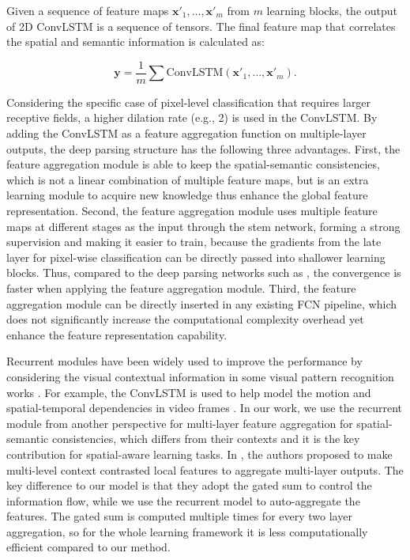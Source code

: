 \documentclass[10pt,twocolumn,twoside]{IEEEtran}
\begin{document}
Given a sequence of feature maps $\mathbf{x}'_1, \ldots, \mathbf{x}'_m$ from $m$ learning blocks, the output of 2D ConvLSTM is a sequence of tensors. The final feature map that correlates the spatial and semantic information is calculated as:

\begin{equation}
\mathbf{y}=\frac{1}{m}\sum\limits \text{ConvLSTM}(\mathbf{x}'_1, \ldots, \mathbf{x}'_m) . 
\end{equation}

Considering the specific case of pixel-level classification that requires larger receptive fields, a higher dilation rate (e.g., 2) is used in the ConvLSTM. By adding the ConvLSTM as a feature aggregation function on multiple-layer outputs, the deep parsing structure has the following three advantages. First, the feature aggregation module is able to keep the spatial-semantic consistencies, which is not a linear combination of multiple feature maps, but is an extra learning module to acquire new knowledge thus enhance the global feature representation. Second, the feature aggregation module uses multiple feature maps at different stages as the input through the stem network, forming a strong supervision and making it easier to train, because the gradients from the late layer for pixel-wise classification can be directly passed into shallower learning blocks. Thus, compared to the deep parsing networks such as \cite{CVPR17:PSPNET,CVPR19:DANET}, the convergence is faster when applying the feature aggregation module. Third, the feature aggregation module can be directly inserted in any existing FCN pipeline, which does not significantly increase the computational complexity overhead yet enhance the feature representation capability. 


Recurrent modules have been widely used to improve the performance by considering the visual contextual information in some visual pattern recognition works \cite{CVPR18:RNN_SEG,CVPR19:TDBU,ECCV18:AAF,TPAMI:DAG}. For example, the ConvLSTM is used to help model the motion \cite{ISBI19:ML_CONVLSTM} and spatial-temporal dependencies in video frames \cite{BMVC18:FSS_CONVLSTM}. In our work, we use the recurrent module from another perspective for multi-layer feature aggregation for spatial-semantic consistencies, which differs from their contexts and it is the key contribution for spatial-aware learning tasks.  
In \cite{CVPR18:CCL}, the authors proposed to make multi-level context contrasted local features to aggregate multi-layer outputs. The key difference to our model is that they adopt the gated sum to control the information flow, while we use the recurrent model to auto-aggregate the features. The gated sum is computed multiple times for every two layer aggregation, so for the whole learning framework it is less computationally efficient compared to our method. 
\end{document}
